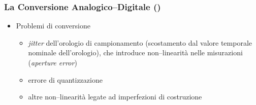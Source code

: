 \begin{frame}
    \frametitle{La Conversione Analogico--Digitale ()}

    \begin{itemize}[<+- | alert@+->]
        \item Problemi di conversione

            \begin{itemize}[<+- | alert@+->]

                \item{\emph{jitter} dell'orologio di campionamento
                    (scostamento dal valore temporale nominale dell'orologio),
                    che introduce non--linearit\`a nelle misurazioni
                    (\emph{aperture error})}

                \item{errore di quantizzazione}

                \item{altre non--linearit\`a legate ad imperfezioni di
                    costruzione}

            \end{itemize}

    \end{itemize}

\end{frame}
